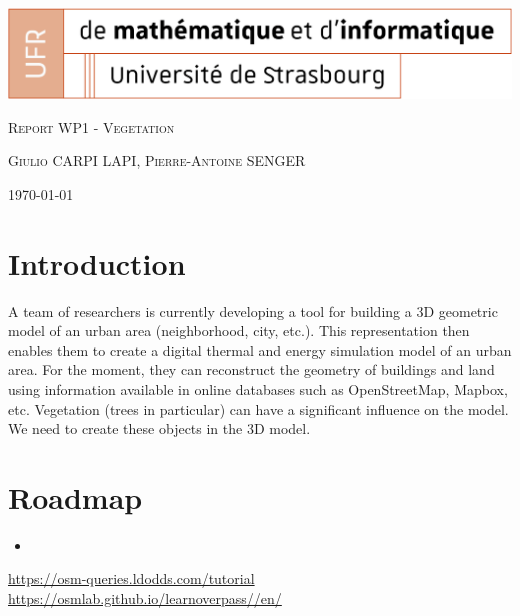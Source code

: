 \documentclass[11pt]{article}
\begin{document}
\begin{titlepage}
    \centering
    \includegraphics[width=1\textwidth]{images/logo_Uni.png}\par\vspace{1cm}
    {\scshape\Large Report WP1 - Vegetation \par}
    \vspace{1cm}
    {\scshape\large Giulio CARPI LAPI, Pierre-Antoine SENGER\par}
    \vspace{1cm}
    {\large \today\par}
\end{titlepage}
 
\tableofcontents %

\newpage %

\section{Introduction}

A team of researchers is currently developing a tool for building a 3D geometric model of an urban area (neighborhood, city, etc.).
This representation then enables them to create a digital thermal and energy simulation model of an urban area.
For the moment, they can reconstruct the geometry of buildings and land using information available in online databases such as OpenStreetMap, Mapbox, etc.
Vegetation (trees in particular) can have a significant influence on the model. We need to create these objects in the 3D model.

\section{Roadmap}
\begin{itemize}
	\item 
\end{itemize}

\begin{thebibliography}{9}
	 \url{https://osm-queries.ldodds.com/tutorial}
	 \url{https://osmlab.github.io/learnoverpass//en/}

\end{thebibliography}
\end{document}
